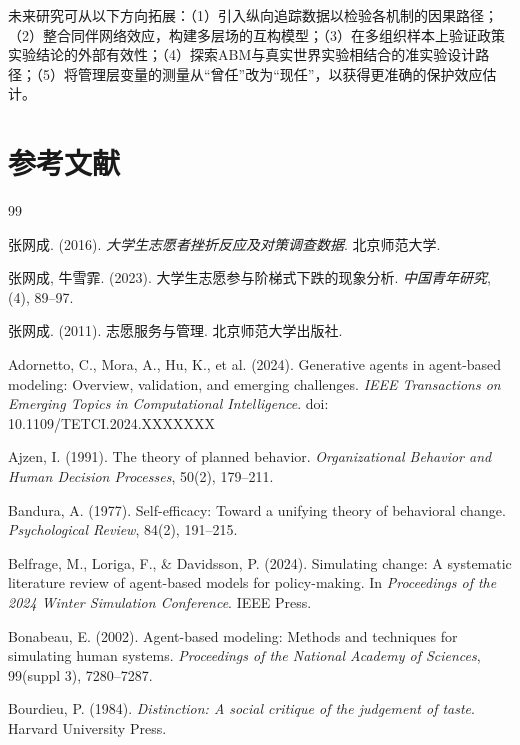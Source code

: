\documentclass[12pt,a4paper]{article}
\begin{document}
未来研究可从以下方向拓展：（1）引入纵向追踪数据以检验各机制的因果路径；（2）整合同伴网络效应，构建多层场的互构模型；（3）在多组织样本上验证政策实验结论的外部有效性；（4）探索ABM与真实世界实验相结合的准实验设计路径；（5）将管理层变量的测量从“曾任”改为“现任”，以获得更准确的保护效应估计。

\vspace{2em}
\section{参考文献}

\begin{thebibliography}{99}
\setlength{\itemsep}{0.3ex}

\item 张网成. (2016). \textit{大学生志愿者挫折反应及对策调查数据}. 北京师范大学.

\item 张网成, 牛雪霏. (2023). 大学生志愿参与阶梯式下跌的现象分析. \textit{中国青年研究}, (4), 89--97.

\item 张网成. (2011). 志愿服务与管理. 北京师范大学出版社.

\item Adornetto, C., Mora, A., Hu, K., et al. (2024). Generative agents in agent-based modeling: Overview, validation, and emerging challenges. \textit{IEEE Transactions on Emerging Topics in Computational Intelligence}. doi: 10.1109/TETCI.2024.XXXXXXX

\item Ajzen, I. (1991). The theory of planned behavior. \textit{Organizational Behavior and Human Decision Processes}, 50(2), 179--211.

\item Bandura, A. (1977). Self-efficacy: Toward a unifying theory of behavioral change. \textit{Psychological Review}, 84(2), 191--215.

\item Belfrage, M., Loriga, F., \& Davidsson, P. (2024). Simulating change: A systematic literature review of agent-based models for policy-making. In \textit{Proceedings of the 2024 Winter Simulation Conference}. IEEE Press.

\item Bonabeau, E. (2002). Agent-based modeling: Methods and techniques for simulating human systems. \textit{Proceedings of the National Academy of Sciences}, 99(suppl 3), 7280--7287.

\item Bourdieu, P. (1984). \textit{Distinction: A social critique of the judgement of taste}. Harvard University Press.


\end{thebibliography}
\end{document}

